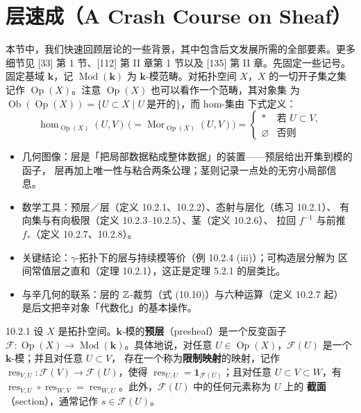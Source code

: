 \section{层速成（A Crash Course on Sheaf）}

本节中，我们快速回顾层论的一些背景，其中包含后文发展所需的全部要素。更多细节见
[33] 第 1 节、[112] 第 II 章第 1 节以及 [135] 第 II 章。先固定一些记号。固定基域
$\mathbf{k}$，记 $\operatorname{Mod}(\mathbf{k})$ 为 $\mathbf{k}$-模范畴。对拓扑空间
$X$，$X$ 的一切开子集之集记作 $\operatorname{Op}(X)$。注意 $\operatorname{Op}(X)$ 也可以看作一个范畴，其对象集
为 $\operatorname{Ob}(\operatorname{Op}(X))=\{U\subset X\mid U\ \text{是开的}\}$，而 hom-集由
下式定义：
\[
  \hom_{\operatorname{Op}(X)}(U,V)\,\bigl(=\operatorname{Mor}_{\operatorname{Op}(X)}(U,V)\bigr)
  =\begin{cases}
    * & \text{若 } U\subset V,\\
    \varnothing & \text{否则}
  \end{cases}
\]

\begin{keytakeaways}
\begin{itemize}
  \item 几何图像：层是「把局部数据粘成整体数据」的装置——预层给出开集到模的函子，
        层再加上唯一性与粘合两条公理；茎则记录一点处的无穷小局部信息。
  \item 数学工具：预层／层（定义 10.2.1、10.2.2）、态射与层化（练习 10.2.1）、
        有向集与有向极限（定义 10.2.3--10.2.5）、茎（定义 10.2.6）、
        拉回 $f^{-1}$ 与前推 $f_*$（定义 10.2.7、10.2.8）。
  \item 关键结论：$\gamma$-拓扑下的层与持续模等价（例 10.2.4 (iii)）；可构造层分解为
        区间常值层之直和（定理 10.2.1），这正是定理 5.2.1 的层类比。
  \item 与辛几何的联系：层的 $\mathbb{Z}$-裁剪（式 (10.10)）与六种运算（定义 10.2.7 起）
        是后文把辛对象「代数化」的基本操作。
\end{itemize}
\end{keytakeaways}

\begin{wdefn}{10.2.1}
  设 $X$ 是拓扑空间。$\mathbf{k}$-模的\textbf{预层}（presheaf）是一个反变函子
  $\mathcal{F}\colon\operatorname{Op}(X)\to\operatorname{Mod}(\mathbf{k})$。具体地说，对任意
  $U\in\operatorname{Op}(X)$，$\mathcal{F}(U)$ 是一个 $\mathbf{k}$-模；并且对任意 $U\subset V$，
  存在一个称为\textbf{限制映射}的映射，记作
  $\operatorname{res}_{V,U}\colon\mathcal{F}(V)\to\mathcal{F}(U)$，使得
  $\operatorname{res}_{U,U}=\mathbf{1}_{\mathcal{F}(U)}$；且对任意
  $U\subset V\subset W$，有
  $\operatorname{res}_{V,U}\circ\operatorname{res}_{W,V}
  =\operatorname{res}_{W,U}$。此外，$\mathcal{F}(U)$ 中的任何元素称为 $U$ 上的
  \textbf{截面}（section），通常记作 $s\in\mathcal{F}(U)$。
\end{wdefn}

